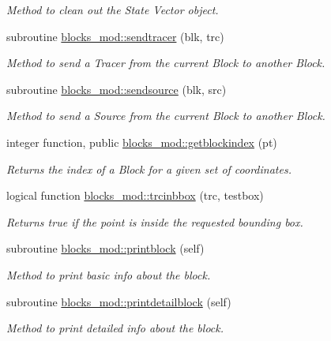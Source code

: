 \begin{DoxyCompactItemize}
\begin{DoxyCompactList}\small\item\em Method to clean out the State Vector object. \end{DoxyCompactList}\item 
subroutine \mbox{\hyperlink{namespaceblocks__mod_a5a9992de40470e417ec8e40e688f6a0e}{blocks\+\_\+mod\+::sendtracer}} (blk, trc)
\begin{DoxyCompactList}\small\item\em Method to send a Tracer from the current Block to another Block. \end{DoxyCompactList}\item 
subroutine \mbox{\hyperlink{namespaceblocks__mod_a1e632738786730731a48d9a432f6ab84}{blocks\+\_\+mod\+::sendsource}} (blk, src)
\begin{DoxyCompactList}\small\item\em Method to send a Source from the current Block to another Block. \end{DoxyCompactList}\item 
integer function, public \mbox{\hyperlink{namespaceblocks__mod_a62e8fb0d6b2535b4499c7a4d848c24ba}{blocks\+\_\+mod\+::getblockindex}} (pt)
\begin{DoxyCompactList}\small\item\em Returns the index of a Block for a given set of coordinates. \end{DoxyCompactList}\item 
logical function \mbox{\hyperlink{namespaceblocks__mod_a101d0a23b5b56baf6e5bd35bc7b677b0}{blocks\+\_\+mod\+::trcinbbox}} (trc, testbox)
\begin{DoxyCompactList}\small\item\em Returns true if the point is inside the requested bounding box. \end{DoxyCompactList}\item 
subroutine \mbox{\hyperlink{namespaceblocks__mod_a6eab8b323cb15dcecb5c6b0c31b4e246}{blocks\+\_\+mod\+::printblock}} (self)
\begin{DoxyCompactList}\small\item\em Method to print basic info about the block. \end{DoxyCompactList}\item 
subroutine \mbox{\hyperlink{namespaceblocks__mod_a10f356706988c45a255922fe70851488}{blocks\+\_\+mod\+::printdetailblock}} (self)
\begin{DoxyCompactList}\small\item\em Method to print detailed info about the block. \end{DoxyCompactList}\item 

\end{DoxyCompactItemize}
